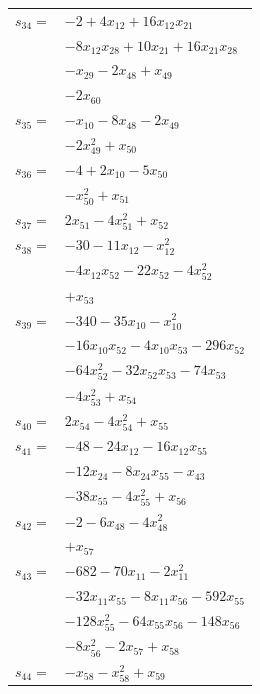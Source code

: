 \begin{longtable}{@{}r@{\;}l@{}}
\(s_{34}=\) & \(\displaystyle -2 +4x_{12} +16x_{12}x_{21}\) \\
 & \(\displaystyle -8x_{12}x_{28} +10x_{21} +16x_{21}x_{28}\) \\
 & \(\displaystyle -x_{29} -2x_{48} +x_{49}\) \\
 & \(\displaystyle -2x_{60}\) \\[3pt]
\(s_{35}=\) & \(\displaystyle -x_{10} -8x_{48} -2x_{49}\) \\
 & \(\displaystyle -2x_{49}^{2} +x_{50}\) \\[3pt]
\(s_{36}=\) & \(\displaystyle -4 +2x_{10} -5x_{50}\) \\
 & \(\displaystyle -x_{50}^{2} +x_{51}\) \\[3pt]
\(s_{37}=\) & \(\displaystyle 2x_{51} -4x_{51}^{2} +x_{52}\) \\[3pt]
\(s_{38}=\) & \(\displaystyle -30 -11x_{12} -x_{12}^{2}\) \\
 & \(\displaystyle -4x_{12}x_{52} -22x_{52} -4x_{52}^{2}\) \\
 & \(\displaystyle +x_{53}\) \\[3pt]
\(s_{39}=\) & \(\displaystyle -340 -35x_{10} -x_{10}^{2}\) \\
 & \(\displaystyle -16x_{10}x_{52} -4x_{10}x_{53} -296x_{52}\) \\
 & \(\displaystyle -64x_{52}^{2} -32x_{52}x_{53} -74x_{53}\) \\
 & \(\displaystyle -4x_{53}^{2} +x_{54}\) \\[3pt]
\(s_{40}=\) & \(\displaystyle 2x_{54} -4x_{54}^{2} +x_{55}\) \\[3pt]
\(s_{41}=\) & \(\displaystyle -48 -24x_{12} -16x_{12}x_{55}\) \\
 & \(\displaystyle -12x_{24} -8x_{24}x_{55} -x_{43}\) \\
 & \(\displaystyle -38x_{55} -4x_{55}^{2} +x_{56}\) \\[3pt]
\(s_{42}=\) & \(\displaystyle -2 -6x_{48} -4x_{48}^{2}\) \\
 & \(\displaystyle +x_{57}\) \\[3pt]
\(s_{43}=\) & \(\displaystyle -682 -70x_{11} -2x_{11}^{2}\) \\
 & \(\displaystyle -32x_{11}x_{55} -8x_{11}x_{56} -592x_{55}\) \\
 & \(\displaystyle -128x_{55}^{2} -64x_{55}x_{56} -148x_{56}\) \\
 & \(\displaystyle -8x_{56}^{2} -2x_{57} +x_{58}\) \\[3pt]
\(s_{44}=\) & \(\displaystyle -x_{58} -x_{58}^{2} +x_{59}\) \\[3pt]

\end{longtable}
